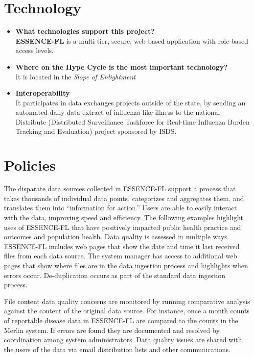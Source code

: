 \documentclass{article}
\begin{document}
\section{Technology}
\begin{itemize}
\item{\textbf{What technologies support this project?}}\\
\textbf{ESSENCE-FL} is a multi-tier, secure, web-based application with role-based access
levels.

\item{\textbf{Where on the Hype Cycle is the most important technology?}}\\
It is located in the \textit{Slope of Enlightment}

\item{\textbf{Interoperability}}\\
It participates in data exchanges projects outside of the state, by sending an automated daily data extract of influenza-like illness to the national Distribute (Distributed Surveillance Taskforce for Real-time Influenza Burden Tracking and Evaluation) project sponsored by ISDS.
\end{itemize}
\section{Policies}

The disparate data sources collected in ESSENCE-FL support a process that takes
thousands of individual data points, categorizes and aggregates them, and translates them into “information for action.” Users are able to easily interact with the data, improving speed and efficiency. The following examples highlight uses of ESSENCE-FL that have positively impacted public health practice and outcomes and population health. 
Data quality is assessed in multiple ways. ESSENCE-FL includes web pages that show
the date and time it last received files from each data source. The system manager has access to additional web pages that show where files are in the data ingestion process and highlights when errors occur. De-duplication occurs as part of the standard data ingestion process. 

File content data quality concerns are monitored by running comparative analysis against the content of the original data source. For instance, once a month counts of reportable disease data in ESSENCE-FL are compared to the counts in the Merlin system. If errors are found they are documented and resolved by coordination among system administrators. Data quality issues are shared with the users of the data via email distribution lists and other communications.
\end{document}
